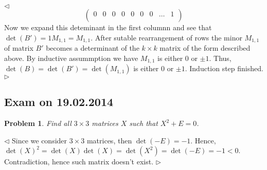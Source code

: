 \documentclass[12pt]{article}
\newtheorem{problem}{Problem}[subsection]
\newenvironment{solution}{\par $\triangleleft$}{$\triangleright$}
\begin{document}
\begin{solution}
$$\begin{pmatrix}
            0      &
            0      &
            0      &
            0      &
            0      &
            0      &
            0      &
            \ldots &
            1        \\
        \end{pmatrix}
    $$
    Now we expand this deteminant in the first columnn and see that $\det(B')=1
        M_{1,1}=M_{1,1}$. After sutable rearrangement of rows the minor
    $M_{1,1}$ of matrix $B'$ becomes a determinant of the $k\times k$ matrix
    of the form described above. By inductive assummption we have $M_{1,1}$
    is either $0$ or $\pm 1$. Thus, $\det(B)=\det(B')=\det(M_{1,1})$ is
    either $0$ or $\pm 1$. Induction step finished.
\end{solution}














\newpage

\subsection{Exam on 19.02.2014}

\begin{problem} Find all $3\times 3$ matrices $X$ such that $X^2+E=0$.
\end{problem}
\begin{solution} Since we consider $3\times 3$ matrices, then $\det(-E)=-1$.
    Hence, ${\det(X)}^2=\det(X)\det(X)=\det(X^2)=\det(-E)=-1<0$. Contradiction,
    hence such matrix doesn't exist.
\end{solution}
\end{document}
